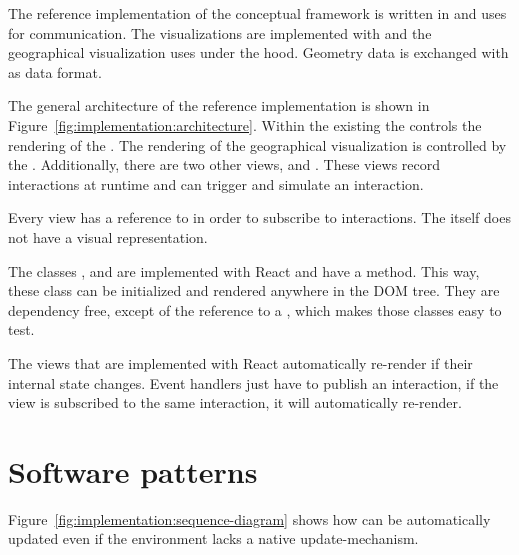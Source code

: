 The reference implementation of the conceptual framework is written in  and uses  for communication.
The visualizations are implemented with  and the geographical visualization uses  under the hood.
Geometry data is exchanged with  as data format.

The general architecture of the reference implementation is shown in Figure~\ref{fig:implementation:architecture}.
Within the existing \visan{} the  controls the rendering of the \tmap{}.
The rendering of the geographical visualization is controlled by the .
Additionally, there are two other views,  and .
These views record interactions at runtime and can trigger and simulate an interaction.

Every view has a reference to  in order to subscribe to interactions.
The  itself does not have a visual representation.

The classes ,  and  are implemented with React and have a  method.
This way, these class can be initialized and rendered anywhere in the DOM tree.
They are dependency free, except of the reference to a , which makes those classes easy to test.

The views that are implemented with React automatically re-render if their internal state changes.
Event handlers just have to publish an interaction, if the view is subscribed to the same interaction, it will automatically re-render.

\section{Software patterns}\label{sec:implementation:patterns}
Figure~\ref{fig:implementation:sequence-diagram} shows how \cmvs{} can be automatically updated even if the environment lacks a native update-mechanism.

